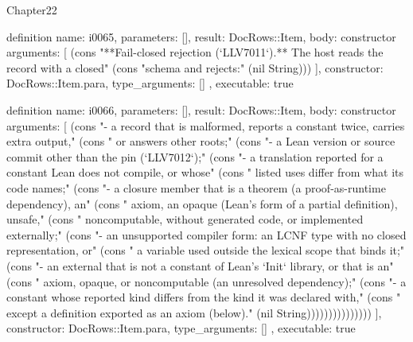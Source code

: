 \begin{lexlean}{Chapter22}
\begin{semanticmodule}
definition{
  name: i0065,
  parameters: [],
  result: DocRows::Item,
  body: constructor{
    arguments: [
      (cons "**Fail-closed rejection (`LLV7011`).** The host reads the record with a closed" (cons "schema and rejects:" (nil String)))
    ],
    constructor: DocRows::Item.para,
    type_arguments: []
  },
  executable: true
}

definition{
  name: i0066,
  parameters: [],
  result: DocRows::Item,
  body: constructor{
    arguments: [
      (cons "- a record that is malformed, reports a constant twice, carries extra output," (cons "  or answers other roots;" (cons "- a Lean version or source commit other than the pin (`LLV7012`);" (cons "- a translation reported for a constant Lean does not compile, or whose" (cons "  listed uses differ from what its code names;" (cons "- a closure member that is a theorem (a proof-as-runtime dependency), an" (cons "  axiom, an opaque (Lean's form of a partial definition), unsafe," (cons "  noncomputable, without generated code, or implemented externally;" (cons "- an unsupported compiler form: an LCNF type with no closed representation, or" (cons "  a variable used outside the lexical scope that binds it;" (cons "- an external that is not a constant of Lean's `Init` library, or that is an" (cons "  axiom, opaque, or noncomputable (an unresolved dependency);" (cons "- a constant whose reported kind differs from the kind it was declared with," (cons "  except a definition exported as an axiom (below)." (nil String)))))))))))))))
    ],
    constructor: DocRows::Item.para,
    type_arguments: []
  },
  executable: true
}


\end{semanticmodule}
\end{lexlean}
